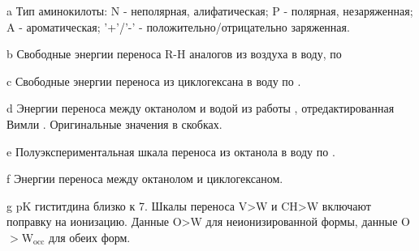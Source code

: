 \begin{table}
\begin{threeparttable}
\begin{tabular}{lccccc|c}
\end{tabular}
\begin{tablenotes}
	\item[a]{Тип аминокилоты: N - неполярная, алифатическая; P - полярная, незаряженная; A - ароматическая; '+'/'-' - положительно/отрицательно заряженная.}
	\item[b]{ Свободные энергии переноса R-H аналогов из воздуха в воду, по \cite{wolf_1981}}
	 \item[c] Свободные энергии переноса из циклогексана в воду по \cite{wolfenden_1988}.
	\item[d] Энергии переноса между октанолом и водой из работы \cite{fauchere_1983}, отредактированная Вимли \cite{wimley_1996}. Оригинальные значения в скобках.
	\item[e] Полуэкспериментальная шкала переноса из октанола в воду по \cite{wimley_1996}.
		\item[f] {Энергии переноса между октанолом и циклогексаном.}
	\item[g] pK гиститдина близко к 7.	Шкалы переноса V>W и CH>W включают поправку на ионизацию. Данные O>W для неионизированной формы, данные O$>$W$_{\text{occ}}$ для обеих форм.

	
	


\end{tablenotes}	

\end{threeparttable}	
\end{table}
	 